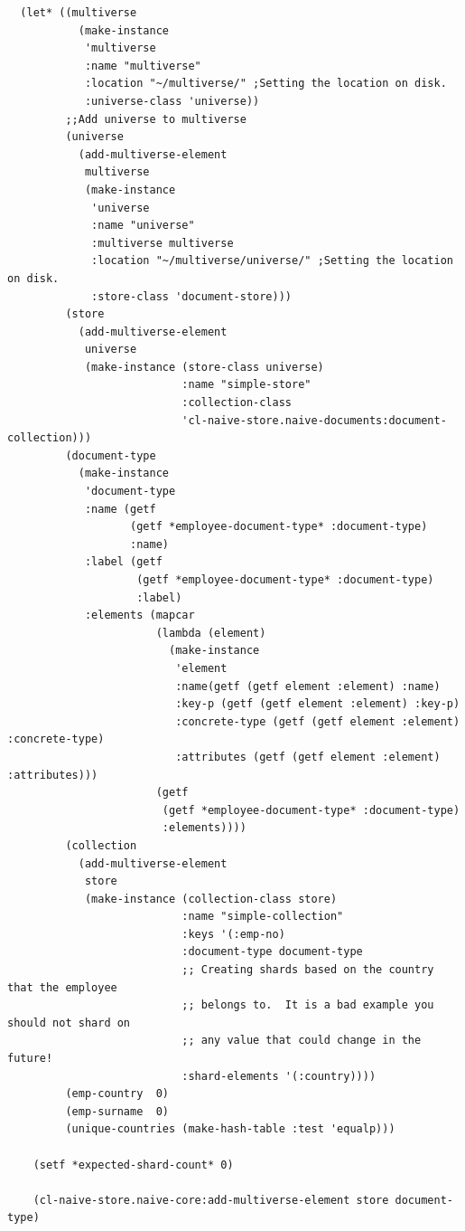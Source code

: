 \documentclass[11pt]{article}
\begin{document}
\begin{verbatim}
  (let* ((multiverse
           (make-instance
            'multiverse
            :name "multiverse"
            :location "~/multiverse/" ;Setting the location on disk.
            :universe-class 'universe))
         ;;Add universe to multiverse
         (universe
           (add-multiverse-element
            multiverse
            (make-instance
             'universe
             :name "universe"
             :multiverse multiverse
             :location "~/multiverse/universe/" ;Setting the location on disk.
             :store-class 'document-store)))
         (store
           (add-multiverse-element
            universe
            (make-instance (store-class universe)
                           :name "simple-store"
                           :collection-class
                           'cl-naive-store.naive-documents:document-collection)))
         (document-type
           (make-instance
            'document-type
            :name (getf
                   (getf *employee-document-type* :document-type)
                   :name)
            :label (getf
                    (getf *employee-document-type* :document-type)
                    :label)
            :elements (mapcar
                       (lambda (element)
                         (make-instance
                          'element
                          :name(getf (getf element :element) :name)
                          :key-p (getf (getf element :element) :key-p)
                          :concrete-type (getf (getf element :element) :concrete-type)
                          :attributes (getf (getf element :element) :attributes)))
                       (getf
                        (getf *employee-document-type* :document-type)
                        :elements))))
         (collection
           (add-multiverse-element
            store
            (make-instance (collection-class store)
                           :name "simple-collection"
                           :keys '(:emp-no)
                           :document-type document-type
                           ;; Creating shards based on the country that the employee
                           ;; belongs to.  It is a bad example you should not shard on
                           ;; any value that could change in the future!
                           :shard-elements '(:country))))
         (emp-country  0)
         (emp-surname  0)
         (unique-countries (make-hash-table :test 'equalp)))

    (setf *expected-shard-count* 0)

    (cl-naive-store.naive-core:add-multiverse-element store document-type)


\end{verbatim}
\end{document}
